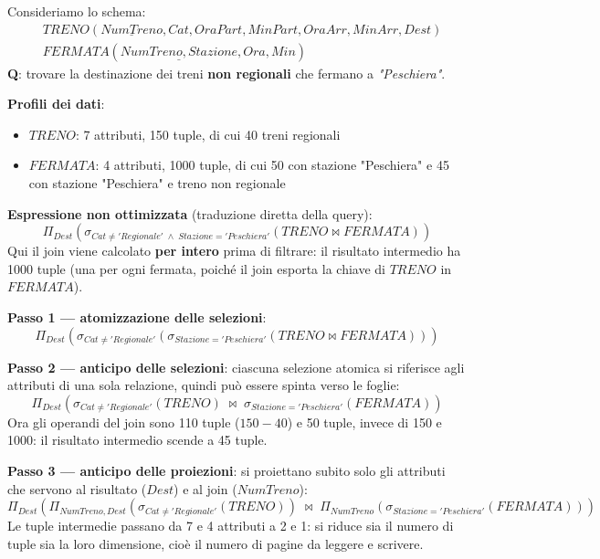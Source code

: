 \documentclass[a4paper,twoside]{article}
\begin{document}
\begin{example}
  Consideriamo lo schema:
  \[
    \begin{aligned}
      &TRENO(\underline{NumTreno}, Cat, OraPart, MinPart, OraArr, MinArr, Dest)\\
      &FERMATA(\underline{NumTreno, Stazione}, Ora, Min)
    \end{aligned}
  \]
  \textbf{Q}: trovare la destinazione dei treni \textbf{non regionali} che fermano a
  \textit{"Peschiera"}.

  \vspace{1em}
  \noindent
  \textbf{Profili dei dati}:
  \begin{itemize}
    \item \( TRENO \): 7 attributi, 150 tuple, di cui 40 treni regionali
    \item \( FERMATA \): 4 attributi, 1000 tuple, di cui 50 con stazione "Peschiera"
      e 45 con stazione "Peschiera" e treno non regionale
  \end{itemize}

  \vspace{1em}
  \noindent
  \textbf{Espressione non ottimizzata} (traduzione diretta della query):
  \[
    \Pi_{Dest}\left(
      \sigma_{Cat \neq 'Regionale' \;\land\; Stazione = 'Peschiera'}
      (TRENO \bowtie FERMATA)
    \right)
  \]
  Qui il join viene calcolato \textbf{per intero} prima di filtrare: il risultato
  intermedio ha 1000 tuple (una per ogni fermata, poiché il join esporta la chiave di
  \( TRENO \) in \( FERMATA \)).

  \vspace{1em}
  \noindent
  \textbf{Passo 1 --- atomizzazione delle selezioni}:
  \[
    \Pi_{Dest}\left(
      \sigma_{Cat \neq 'Regionale'}\left(
        \sigma_{Stazione = 'Peschiera'}(TRENO \bowtie FERMATA)
      \right)
    \right)
  \]

  \vspace{1em}
  \noindent
  \textbf{Passo 2 --- anticipo delle selezioni}: ciascuna selezione atomica si riferisce
  agli attributi di una sola relazione, quindi può essere spinta verso le foglie:
  \[
    \Pi_{Dest}\left(
      \sigma_{Cat \neq 'Regionale'}(TRENO)
      \;\bowtie\;
      \sigma_{Stazione = 'Peschiera'}(FERMATA)
    \right)
  \]
  Ora gli operandi del join sono 110 tuple (\( 150 - 40 \)) e 50 tuple, invece di 150 e
  1000: il risultato intermedio scende a 45 tuple.

  \vspace{1em}
  \noindent
  \textbf{Passo 3 --- anticipo delle proiezioni}: si proiettano subito solo gli attributi
  che servono al risultato (\( Dest \)) e al join (\( NumTreno \)):
  \[
    \Pi_{Dest}\left(
      \Pi_{NumTreno, Dest}\left( \sigma_{Cat \neq 'Regionale'}(TRENO) \right)
      \;\bowtie\;
      \Pi_{NumTreno}\left( \sigma_{Stazione = 'Peschiera'}(FERMATA) \right)
    \right)
  \]
  Le tuple intermedie passano da 7 e 4 attributi a 2 e 1: si riduce sia il numero di
  tuple sia la loro dimensione, cioè il numero di pagine da leggere e scrivere.
\end{example}
\end{document}
